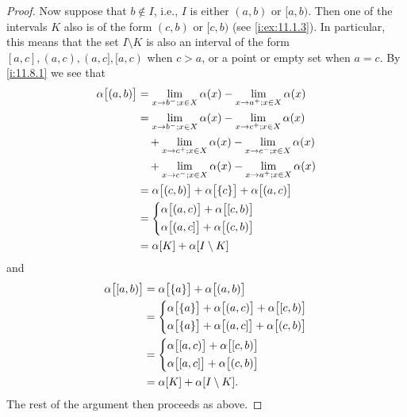 \begin{proof}
  Now suppose that \(b \notin I\), i.e., \(I\) is either \((a, b)\) or \([a, b)\).
  Then one of the intervals \(K\) also is of the form \((c, b)\) or \([c, b)\) (see \cref{i:ex:11.1.3}).
      In particular, this means that the set \(I \setminus K\) is also an interval of the form \([a, c], (a, c), (a, c], [a, c)\) when \(c > a\), or a point or empty set when \(a = c\).
  By \cref{i:11.8.1} we see that
  \begin{align*}
    \alpha\big[(a, b)\big] & = \lim_{x \to b^- ; x \in X} \alpha(x) - \lim_{x \to a^+ ; x \in X} \alpha(x)       \\
                           & = \lim_{x \to b^- ; x \in X} \alpha(x) - \lim_{x \to c^+ ; x \in X} \alpha(x)       \\
                           & \quad + \lim_{x \to c^+ ; x \in X} \alpha(x) - \lim_{x \to c^- ; x \in X} \alpha(x) \\
                           & \quad + \lim_{x \to c^- ; x \in X} \alpha(x) - \lim_{x \to a^+ ; x \in X} \alpha(x) \\
                           & = \alpha\big[(c, b)\big] + \alpha\big[\set{c}\big] + \alpha\big[(a, c)\big]         \\
                           & = \begin{dcases}
                                 \alpha\big[(a, c)\big] + \alpha\big[[c, b)\big] \\
                                   \alpha\big[(a, c]\big] + \alpha\big[(c, b)\big]
                               \end{dcases}        \\
                           & = \alpha[K] + \alpha[I \setminus K]
  \end{align*}
  and
  \begin{align*}
    \alpha\big[[a, b)\big] & = \alpha\big[\set{a}\big] + \alpha\big[(a, b)\big]                                                                     \\
                           & = \begin{dcases}
                                 \alpha\big[\set{a}\big] + \alpha\big[(a, c)\big] + \alpha\big[[c, b)\big] \\
                                   \alpha\big[\set{a}\big] + \alpha\big[(a, c]\big] + \alpha\big[(c, b)\big]
                               \end{dcases} \\
                           & = \begin{dcases}
                                 \alpha\big[[a, c)\big] + \alpha\big[[c, b)\big] \\
                                 \alpha\big[[a, c]\big] + \alpha\big[(c, b)\big]
                               \end{dcases}                                      \\
                           & = \alpha[K] + \alpha[I \setminus K].
  \end{align*}
  The rest of the argument then proceeds as above.
\end{proof}

